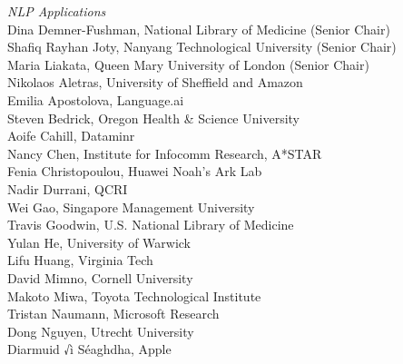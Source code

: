 \emph{NLP Applications} \\
\hspace*{0.2in} Dina Demner-Fushman, National Library of Medicine (Senior Chair)\\
\hspace*{0.2in} Shafiq Rayhan Joty, Nanyang Technological University (Senior Chair)\\
\hspace*{0.2in} Maria Liakata, Queen Mary University of London (Senior Chair)\\
\hspace*{0.2in} Nikolaos Aletras, University of Sheffield and Amazon\\
\hspace*{0.2in} Emilia Apostolova, Language.ai\\
\hspace*{0.2in} Steven Bedrick, Oregon Health & Science University\\
\hspace*{0.2in} Aoife Cahill, Dataminr\\
\hspace*{0.2in} Nancy Chen, Institute for Infocomm Research, A*STAR\\
\hspace*{0.2in} Fenia Christopoulou, Huawei Noah's Ark Lab\\
\hspace*{0.2in} Nadir Durrani, QCRI\\
\hspace*{0.2in} Wei Gao, Singapore Management University\\
\hspace*{0.2in} Travis Goodwin, U.S. National Library of Medicine\\
\hspace*{0.2in} Yulan He, University of Warwick\\
\hspace*{0.2in} Lifu Huang, Virginia Tech\\
\hspace*{0.2in} David Mimno, Cornell University\\
\hspace*{0.2in} Makoto Miwa, Toyota Technological Institute\\
\hspace*{0.2in} Tristan Naumann, Microsoft Research\\
\hspace*{0.2in} Dong Nguyen, Utrecht University\\
\hspace*{0.2in} Diarmuid √ì S\'eaghdha, Apple\\
